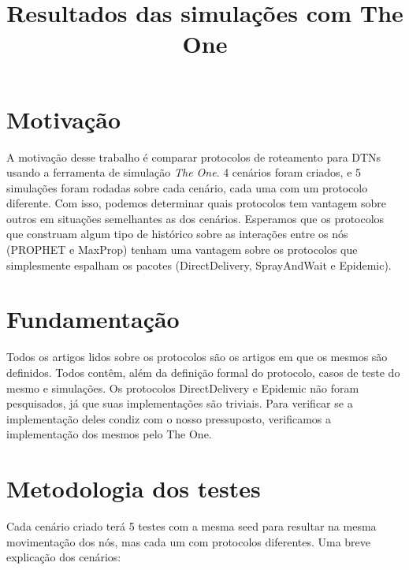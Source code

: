 \documentclass[conference]{IEEEtran}
\begin{document}
\title{Resultados das simulações com The One}

\author{
\and
{}
}

\maketitle
\IEEEpeerreviewmaketitle

\section{Motivação}
  A motivação desse trabalho é comparar protocolos de roteamento para DTNs usando a ferramenta de simulação
\textit{The One}. 4 cenários foram criados, e 5 simulações foram rodadas sobre cada cenário, cada uma com
um protocolo diferente. Com isso, podemos determinar quais protocolos tem vantagem sobre outros em situações
semelhantes as dos cenários.
  Esperamos que os protocolos que construam algum tipo de histórico sobre as interações entre os nós (PROPHET e MaxProp) tenham uma 
vantagem sobre os protocolos que simplesmente espalham os pacotes (DirectDelivery, SprayAndWait e Epidemic). 

\section{Fundamentação}
  Todos os artigos lidos sobre os protocolos são os artigos em que os mesmos são definidos. Todos contêm, além da definição formal do
protocolo, casos de teste do mesmo e simulações. Os protocolos DirectDelivery e Epidemic não foram pesquisados, já que suas implementações
são triviais. Para verificar se a implementação deles condiz com o nosso pressuposto, verificamos a implementação dos mesmos pelo The One.

\section{Metodologia dos testes}
  Cada cenário criado terá 5 testes com a mesma seed para resultar na mesma movimentação dos nós, mas cada um com protocolos diferentes.
Uma breve explicação dos cenários:
\end{document}
